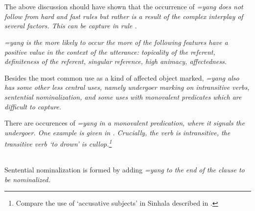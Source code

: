  \\
 \\
The above discussion should have shown that the occurrence of \em =yang \em does not follow from hard and fast rules but rather is a result of the complex interplay of several factors. This can be capture in rule .



\ea\label{ex:form:yang:rule}
\em  \em=yang \em is the more likely to occur the more of the following features have a positive value in the context of the utterance: topicality of the referent, definiteness of the referent, singular reference, high animacy, affectedness.\em
\z

Besides the most common use as a kind of affected object marked, \em =yang \em also has some other less central uses, namely undergoer marking on intransitive verbs, sentential nominalization, and some uses with monovalent predicates which are difficult to capture.


There are occurences of \em =yang \em in a monovalent predication, where it signals the undergoer. One example is given in . Crucially, the verb  is intransitive, the transitive verb `to drown' is \em cullop\em.\footnote{Compare the use of `accusative subjects' in Sinhala described in \citep{abc}.}


 \\

Sentential nominalization is formed by adding \em =yang \em to the end of the clause to be nominalized.


